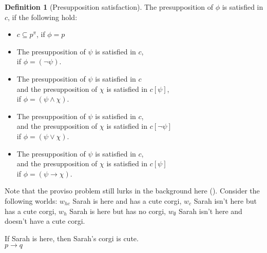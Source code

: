\documentclass[nols,twoside,nofonts,nobib,nohyper]{tufte-handout}
\theoremstyle{definition}
\newtheorem{definition}{Definition}[section]
\begin{document}
\begin{definition}[Presupposition satisfaction] The presupposition of  $ϕ$ is satisfied in $c$, if the following hold:

  \begin{itemize}
      \item $c \subseteq p^{π}$, if $ϕ = p$
    \item The presupposition of $ψ$ is satisfied in $c$,\\
      if $ϕ = (¬ ψ)$.
    \item The presupposition of $ψ$ is satisfied in $c$\\
      and the presupposition of $χ$ is satisfied in $c[ψ]$,\\
      if $ϕ = (ψ ∧ χ)$.
    \item The presupposition of $ψ$ is satisfied in $c$,\\
      and the presupposition of $χ$ is satisfied in $c[¬ ψ]$\\
      if $ϕ = (ψ ∨ χ)$.
    \item The presupposition of $ψ$ is satisfied in $c$,\\
      and the presupposition of $χ$ is satisfied in $c[ψ]$\\
      if $ϕ = (ψ → χ)$.
  \end{itemize}

\end{definition}

Note that the proviso problem still lurks in the background here (\citealt{Geurts1996}). Consider the following worlds: $w_{hc}$ Sarah is here and has a cute corgi, $w_{c}$ Sarah isn't here but has a cute corgi, $w_{h}$ Sarah is here but has no corgi, $w_{∅}$ Sarah isn't here and doesn't have a cute corgi.

\ex
If Sarah is here, then Sarah's corgi is cute.\\
$p → q$
\xe
\end{document}
